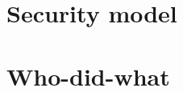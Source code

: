 \documentclass[]{report}
\begin{document}

\dominitoc
{}
\tableofcontents











\appendix
\chapter{Security model}

\chapter{Who-did-what}

\end{document}
